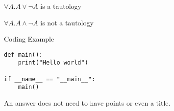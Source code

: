 \documentclass{exsheetans}  %
\author{[123456]~Author~Name, [123457]~Author2~Name} %
\begin{document}
\begin{quiz}
	\item $\forall A.A\lor\neg A$ is a tautology
    \item $\forall A.A\land\neg A$ is not a tautology
\end{quiz}
\begin{answer}[3]{Coding Example}
    \begin{verbatim}
def main():
    print("Hello world")

if __name__ == "__main__":
    main()
    \end{verbatim}
\end{answer}
\begin{answer}{}
    An answer does not need to have points or even a title.
\end{answer}
\end{document}
